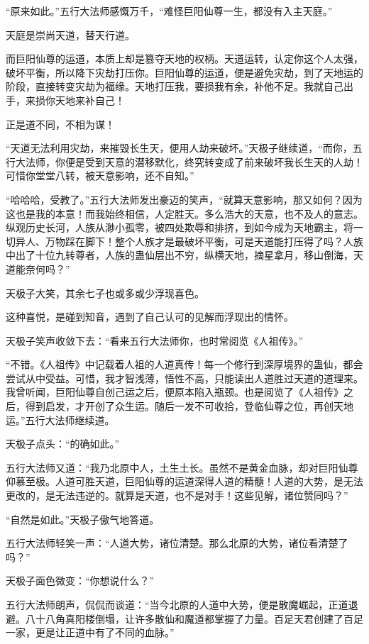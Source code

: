 \begin{this_body}
“原来如此。”五行大法师感慨万千，“难怪巨阳仙尊一生，都没有入主天庭。”

天庭是崇尚天道，替天行道。

而巨阳仙尊的运道，本质上却是篡夺天地的权柄。天道运转，认定你这个人太强，破坏平衡，所以降下灾劫打压你。巨阳仙尊的运道，便是避免灾劫，到了天地运的阶段，直接转变灾劫为福缘。天地打压我，要损我有余，补他不足。我就自己出手，来损你天地来补自己！

正是道不同，不相为谋！

“天道无法利用灾劫，来摧毁长生天，便用人劫来破坏。”天极子继续道，“而你，五行大法师，你便是受到天意的潜移默化，终究转变成了前来破坏我长生天的人劫！可惜你堂堂八转，被天意影响，还不自知。”

“哈哈哈，受教了。”五行大法师发出豪迈的笑声，“就算天意影响，那又如何？因为这也是我的本意！而我始终相信，人定胜天。多么浩大的天意，也不及人的意志。纵观历史长河，人族从渺小孤零，被四处欺辱和排挤，到如今成为天地霸主，将一切异人、万物踩在脚下！整个人族才是最破坏平衡，可是天道能打压得了吗？人族中出了十位九转尊者，人族的蛊仙层出不穷，纵横天地，摘星拿月，移山倒海，天道能奈何吗？”

天极子大笑，其余七子也或多或少浮现喜色。

这种喜悦，是碰到知音，遇到了自己认可的见解而浮现出的情怀。

天极子笑声收敛下去：“看来五行大法师你，也时常阅览《人祖传》。”

“不错。《人祖传》中记载着人祖的人道真传！每一个修行到深厚境界的蛊仙，都会尝试从中受益。可惜，我才智浅薄，悟性不高，只能读出人道胜过天道的道理来。我曾听闻，巨阳仙尊自创己运之后，便原本陷入瓶颈。也是阅览了《人祖传》之后，得到启发，才开创了众生运。随后一发不可收拾，登临仙尊之位，再创天地运。”五行大法师继续道。

天极子点头：“的确如此。”

五行大法师又道：“我乃北原中人，土生土长。虽然不是黄金血脉，却对巨阳仙尊仰慕至极。人道可胜天道，巨阳仙尊的运道深得人道的精髓！人道的大势，是无法更改的，是无法违逆的。就算是天道，也不是对手！这些见解，诸位赞同吗？”

“自然是如此。”天极子傲气地答道。

五行大法师轻笑一声：“人道大势，诸位清楚。那么北原的大势，诸位看清楚了吗？”

天极子面色微变：“你想说什么？”

五行大法师朗声，侃侃而谈道：“当今北原的人道中大势，便是散魔崛起，正道退避。八十八角真阳楼倒塌，让许多散仙和魔道都掌握了力量。百足天君创建了百足一家，更是让正道中有了不同的血脉。”


\end{this_body}
